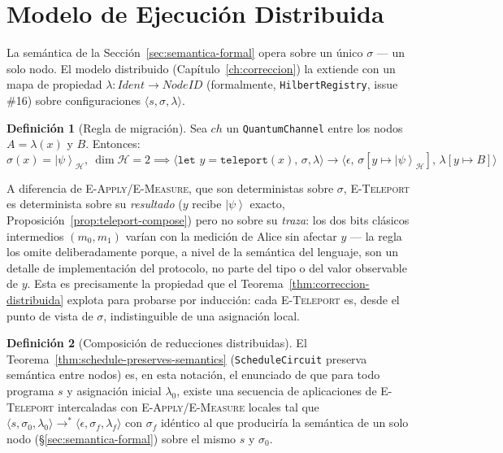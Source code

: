 \documentclass[12pt, a4paper, openany]{report}
\theoremstyle{definition}
\newtheorem{definition}{Definición}[chapter]
\newcommand{\Hilbert}{\mathcal{H}}
\newcommand{\ket}[1]{\left|#1\right\rangle}
\begin{document}
\section{Modelo de Ejecución Distribuida}
\label{sec:semantica-distribuida}

La semántica de la Sección~\ref{sec:semantica-formal} opera sobre un único $\sigma$ — un solo nodo. El modelo distribuido (Capítulo~\ref{ch:correccion}) la extiende con un mapa de propiedad $\lambda : \mathit{Ident} \to \mathit{NodeID}$ (formalmente, \texttt{HilbertRegistry}, issue \#16) sobre configuraciones $\langle s, \sigma, \lambda \rangle$.

\begin{definition}[Regla de migración]
\label{def:regla-teleport}
Sea $\mathit{ch}$ un \texttt{QuantumChannel} entre los nodos $A = \lambda(x)$ y $B$. Entonces:
\[
  \sigma(x) = \ket{\psi}_{\Hilbert},\ \dim\Hilbert = 2 \implies
  \langle \texttt{let } y = \mathtt{teleport}(x),\, \sigma, \lambda \rangle \to \langle \epsilon,\, \sigma[y \mapsto \ket{\psi}_{\Hilbert}],\, \lambda[y \mapsto B] \rangle
\]
\end{definition}

A diferencia de \textsc{E-Apply}/\textsc{E-Measure}, que son deterministas sobre $\sigma$, \textsc{E-Teleport} es determinista sobre su \emph{resultado} ($y$ recibe $\ket{\psi}$ exacto, Proposición~\ref{prop:teleport-compose}) pero no sobre su \emph{traza}: los dos bits clásicos intermedios $(m_0,m_1)$ varían con la medición de Alice sin afectar $y$ — la regla los omite deliberadamente porque, a nivel de la semántica del lenguaje, son un detalle de implementación del protocolo, no parte del tipo o del valor observable de $y$. Esta es precisamente la propiedad que el Teorema~\ref{thm:correccion-distribuida} explota para probarse por inducción: cada \textsc{E-Teleport} es, desde el punto de vista de $\sigma$, indistinguible de una asignación local.

\begin{definition}[Composición de reducciones distribuidas]
El Teorema~\ref{thm:schedule-preserves-semantics} (\texttt{ScheduleCircuit} preserva semántica entre nodos) es, en esta notación, el enunciado de que para todo programa $s$ y asignación inicial $\lambda_0$, existe una secuencia de aplicaciones de \textsc{E-Teleport} intercaladas con \textsc{E-Apply}/\textsc{E-Measure} locales tal que $\langle s, \sigma_0, \lambda_0 \rangle \to^* \langle \epsilon, \sigma_f, \lambda_f \rangle$ con $\sigma_f$ idéntico al que produciría la semántica de un solo nodo (\S\ref{sec:semantica-formal}) sobre el mismo $s$ y $\sigma_0$.
\end{definition}
\end{document}
